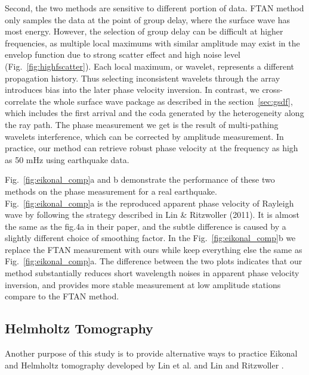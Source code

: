 \documentclass[referee]{gji}
\begin{document}
{{Second, the two methods are sensitive to different portion of data. FTAN method only samples the data at the point of group delay, where the surface wave has most energy. However, the selection of group delay can be difficult at higher frequencies, as multiple local maximums with similar amplitude may exist in the envelop function due to strong scatter effect and high noise level (Fig.~\ref{fig:highfscatter}). Each local maximum, or wavelet, represents a different propagation history. Thus selecting inconsistent wavelets through the array introduces bias into the later phase velocity inversion. In contrast, we cross-correlate the whole surface wave package as described in the section~\ref{sec:gsdf}, which includes the first arrival and the coda generated by the heterogeneity along the ray path. The phase measurement we get is the result of multi-pathing wavelets interference, which can be corrected by amplitude measurement. In practice, our method can retrieve robust phase velocity at the frequency as high as 50 mHz using earthquake data.

Fig.~\ref{fig:eikonal_comp}a and b demonstrate the performance of these two methods on the phase measurement for a real earthquake. Fig.~\ref{fig:eikonal_comp}a is the reproduced apparent phase velocity of Rayleigh wave by following the strategy described in Lin \& Ritzwoller (2011). It is almost the same as the fig.4a in their paper, and the subtle difference is caused by a slightly different choice of smoothing factor. In the Fig.~\ref{fig:eikonal_comp}b we replace the FTAN measurement with ours while keep everything else the same as Fig.~\ref{fig:eikonal_comp}a. The difference between the two plots indicates that our method substantially reduces short wavelength noises in apparent phase velocity inversion, and provides more stable measurement at low amplitude stations compare to the FTAN method. 


\subsection{Helmholtz Tomography}
\label{sec:helm_dis}

Another purpose of this study is to provide alternative ways to practice Eikonal and Helmholtz tomography developed by Lin et al.  and Lin and Ritzwoller . 

}}
\end{document}
